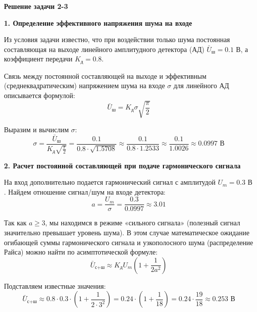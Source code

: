 \textbf{Решение задачи 2-3}

\vspace{1em}
\textbf{1. Определение эффективного напряжения шума на входе}

Из условия задачи известно, что при воздействии только шума постоянная составляющая на выходе линейного амплитудного детектора (АД) $\bar{U}_{\text{ш}} = 0.1 \text{ В}$, а коэффициент передачи $K_{\text{д}} = 0.8$.

Связь между постоянной составляющей на выходе и эффективным (среднеквадратическим) напряжением шума на входе $\sigma$ для линейного АД описывается формулой:
\begin{equation*}
    \bar{U}_{\text{ш}} = K_{\text{д}} \sigma \sqrt{\frac{\pi}{2}}
\end{equation*}

Выразим и вычислим $\sigma$:
\begin{equation*}
    \sigma = \frac{\bar{U}_{\text{ш}}}{K_{\text{д}} \sqrt{\frac{\pi}{2}}} = \frac{0.1}{0.8 \cdot \sqrt{1.5708}} \approx \frac{0.1}{0.8 \cdot 1.2533} \approx \frac{0.1}{1.0026} \approx 0.0997 \text{ В}
\end{equation*}

\vspace{1em}
\textbf{2. Расчет постоянной составляющей при подаче гармонического сигнала}

На вход дополнительно подается гармонический сигнал с амплитудой $U_m = 0.3 \text{ В}$. Найдем отношение сигнал/шум на входе детектора:
\begin{equation*}
    a = \frac{U_m}{\sigma} = \frac{0.3}{0.0997} \approx 3.01
\end{equation*}

Так как $a \ge 3$, мы находимся в режиме «сильного сигнала» (полезный сигнал значительно превышает уровень шума). В этом случае математическое ожидание огибающей суммы гармонического сигнала и узкополосного шума (распределение Райса) можно найти по асимптотической формуле:
\begin{equation*}
    \bar{U}_{\text{с+ш}} \approx K_{\text{д}} U_m \left( 1 + \frac{1}{2a^2} \right)
\end{equation*}

Подставляем известные значения:
\begin{equation*}
    \bar{U}_{\text{с+ш}} \approx 0.8 \cdot 0.3 \cdot \left( 1 + \frac{1}{2 \cdot 3^2} \right) = 0.24 \cdot \left( 1 + \frac{1}{18} \right) = 0.24 \cdot \frac{19}{18} \approx 0.253 \text{ В}
\end{equation*}

